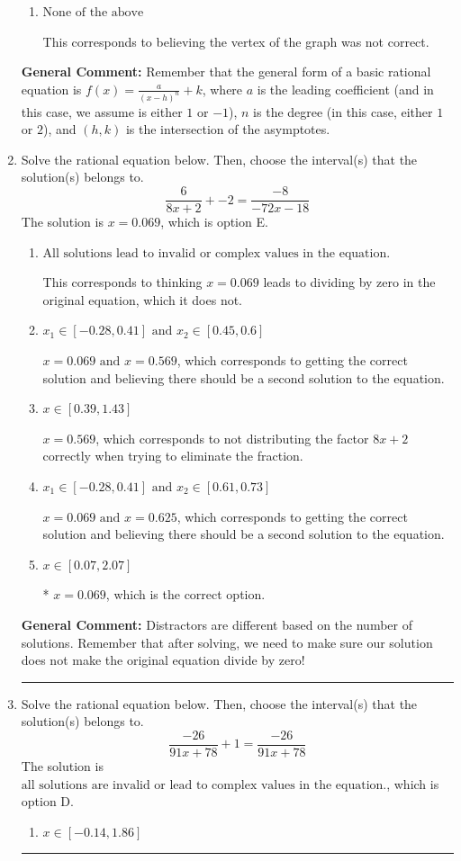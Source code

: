 \documentclass{extbook}[14pt]
\newcommand{\litem}[1]{\item #1

\rule{\textwidth}{0.4pt}}
\begin{document}
\begin{enumerate}
{\begin{enumerate}[label=\Alph*.]
Corresponds to thinking the graph was a shifted version of $\frac{1}{x^2}$.
\item \( \text{None of the above} \)

This corresponds to believing the vertex of the graph was not correct.
\end{enumerate}

\textbf{General Comment:} Remember that the general form of a basic rational equation is $ f(x) = \frac{a}{(x-h)^n} + k$, where $a$ is the leading coefficient (and in this case, we assume is either $1$ or $-1$), $n$ is the degree (in this case, either $1$ or $2$), and $(h, k)$ is the intersection of the asymptotes.
}
\litem{
Solve the rational equation below. Then, choose the interval(s) that the solution(s) belongs to.
\[ \frac{6}{8x + 2} + -2 = \frac{-8}{-72x -18} \]The solution is \( x = 0.069 \), which is option E.\begin{enumerate}[label=\Alph*.]
\item \( \text{All solutions lead to invalid or complex values in the equation.} \)

This corresponds to thinking $x = 0.069$ leads to dividing by zero in the original equation, which it does not.
\item \( x_1 \in [-0.28, 0.41] \text{ and } x_2 \in [0.45,0.6] \)

$x = 0.069 \text{ and } x = 0.569$, which corresponds to getting the correct solution and believing there should be a second solution to the equation.
\item \( x \in [0.39,1.43] \)

$x = 0.569$, which corresponds to not distributing the factor $8x + 2$ correctly when trying to eliminate the fraction.
\item \( x_1 \in [-0.28, 0.41] \text{ and } x_2 \in [0.61,0.73] \)

$x = 0.069 \text{ and } x = 0.625$, which corresponds to getting the correct solution and believing there should be a second solution to the equation.
\item \( x \in [0.07,2.07] \)

* $x = 0.069$, which is the correct option.
\end{enumerate}

\textbf{General Comment:} Distractors are different based on the number of solutions. Remember that after solving, we need to make sure our solution does not make the original equation divide by zero!
}
\litem{
Solve the rational equation below. Then, choose the interval(s) that the solution(s) belongs to.
\[ \frac{-26}{91x + 78} + 1 = \frac{-26}{91x + 78} \]The solution is \( \text{all solutions are invalid or lead to complex values in the equation.} \), which is option D.\begin{enumerate}[label=\Alph*.]
\item \( x \in [-0.14,1.86] \)


\end{enumerate}}
\end{enumerate}
\end{document}
